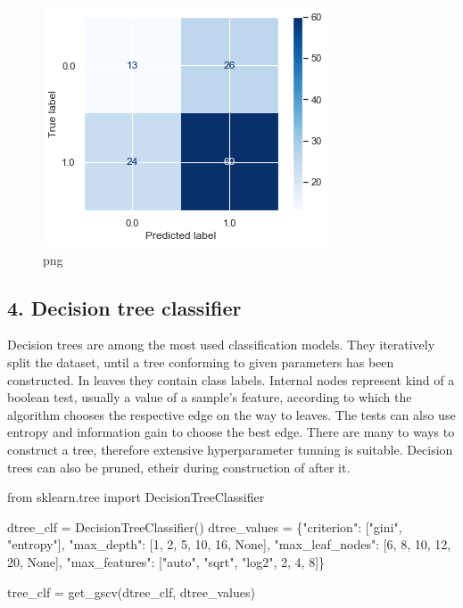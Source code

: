 \documentclass[]{article}
\newenvironment{Shaded}{}{}
\newcommand{\DecValTok}[1]{\textcolor[rgb]{0.25,0.63,0.44}{#1}}
\newcommand{\ImportTok}[1]{#1}
\newcommand{\NormalTok}[1]{#1}
\newcommand{\OperatorTok}[1]{\textcolor[rgb]{0.40,0.40,0.40}{#1}}
\newcommand{\StringTok}[1]{\textcolor[rgb]{0.25,0.44,0.63}{#1}}
\newcommand{\VariableTok}[1]{\textcolor[rgb]{0.10,0.09,0.49}{#1}}
\begin{document}
\begin{figure}
\centering
\includegraphics{notebook_files/notebook_41_3.png}
\caption{png}
\end{figure}

\hypertarget{decision-tree-classifier}{%
\subsection{4. Decision tree
classifier}\label{decision-tree-classifier}}

Decision trees are among the most used classification models. They
iteratively split the dataset, until a tree conforming to given
parameters has been constructed. In leaves they contain class labels.
Internal nodes represent kind of a boolean test, usually a value of a
sample's feature, according to which the algorithm chooses the
respective edge on the way to leaves. The tests can also use entropy and
information gain to choose the best edge. There are many to ways to
construct a tree, therefore extensive hyperparameter tunning is
suitable. Decision trees can also be pruned, etheir during construction
of after it.

\begin{Shaded}
\begin{Highlighting}[]
\ImportTok{from}\NormalTok{ sklearn.tree }\ImportTok{import}\NormalTok{ DecisionTreeClassifier}

\NormalTok{dtree_clf }\OperatorTok{=}\NormalTok{ DecisionTreeClassifier()}
\NormalTok{dtree_values }\OperatorTok{=}\NormalTok{ \{}\StringTok{"criterion"}\NormalTok{: [}\StringTok{"gini"}\NormalTok{, }\StringTok{"entropy"}\NormalTok{],}
                \StringTok{"max_depth"}\NormalTok{: [}\DecValTok{1}\NormalTok{, }\DecValTok{2}\NormalTok{, }\DecValTok{5}\NormalTok{, }\DecValTok{10}\NormalTok{, }\DecValTok{16}\NormalTok{, }\VariableTok{None}\NormalTok{],}
                \StringTok{"max_leaf_nodes"}\NormalTok{: [}\DecValTok{6}\NormalTok{, }\DecValTok{8}\NormalTok{, }\DecValTok{10}\NormalTok{, }\DecValTok{12}\NormalTok{, }\DecValTok{20}\NormalTok{, }\VariableTok{None}\NormalTok{],}
                \StringTok{"max_features"}\NormalTok{: [}\StringTok{"auto"}\NormalTok{, }\StringTok{"sqrt"}\NormalTok{, }\StringTok{"log2"}\NormalTok{, }\DecValTok{2}\NormalTok{, }\DecValTok{4}\NormalTok{, }\DecValTok{8}\NormalTok{]\}}
                
\NormalTok{tree_clf }\OperatorTok{=}\NormalTok{ get_gscv(dtree_clf, dtree_values)}
\end{Highlighting}
\end{Shaded}
\end{document}

